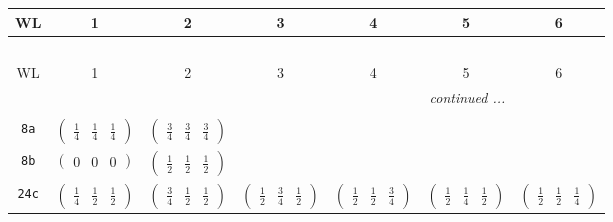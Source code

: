\documentclass[fleqn,9pt,landscape]{jsarticle}
\begin{document}
\begin{center}
\renewcommand{\arraystretch}{1.2}
\begin{longtable}{ccccccc}
 \hline \hline
WL & 1 & 2 & 3 & 4 & 5 & 6 \\ \hline \endfirsthead

\multicolumn{6}{l}{\tablename\ \thetable{}} \\
 \hline \hline
WL & 1 & 2 & 3 & 4 & 5 & 6 \\ \hline \endhead

 \hline \hline
\multicolumn{6}{r}{\footnotesize\it continued ...} \\ \endfoot

 \hline \hline
\multicolumn{6}{r}{} \\ \endlastfoot

{\tt 8a} & $ \begin{pmatrix} \frac{1}{4} & \frac{1}{4} & \frac{1}{4} \end{pmatrix} $ & $ \begin{pmatrix} \frac{3}{4} & \frac{3}{4} & \frac{3}{4} \end{pmatrix} $ & $  $ & $  $ & $  $ & $  $ \\ \hline
{\tt 8b} & $ \begin{pmatrix} 0 & 0 & 0 \end{pmatrix} $ & $ \begin{pmatrix} \frac{1}{2} & \frac{1}{2} & \frac{1}{2} \end{pmatrix} $ & $  $ & $  $ & $  $ & $  $ \\ \hline
{\tt 24c} & $ \begin{pmatrix} \frac{1}{4} & \frac{1}{2} & \frac{1}{2} \end{pmatrix} $ & $ \begin{pmatrix} \frac{3}{4} & \frac{1}{2} & \frac{1}{2} \end{pmatrix} $ & $ \begin{pmatrix} \frac{1}{2} & \frac{3}{4} & \frac{1}{2} \end{pmatrix} $ & $ \begin{pmatrix} \frac{1}{2} & \frac{1}{2} & \frac{3}{4} \end{pmatrix} $ & $ \begin{pmatrix} \frac{1}{2} & \frac{1}{4} & \frac{1}{2} \end{pmatrix} $ & $ \begin{pmatrix} \frac{1}{2} & \frac{1}{2} & \frac{1}{4} \end{pmatrix} $ \\ \hline

\end{longtable}
\end{center}
\end{document}
